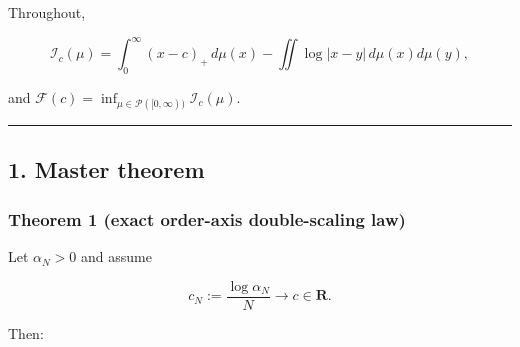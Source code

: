\documentclass[11pt]{article}
\theoremstyle{keio}
\theoremstyle{definition}
\theoremstyle{remark}
\begin{document}
Throughout,

\[
\mathcal I_c(\mu)
=\int_0^\infty (x-c)_+\,d\mu(x)
-\iint\log|x-y|\,d\mu(x)d\mu(y),
\]

and \(\mathcal F(c)=\inf_{\mu\in\mathcal P([0,\infty))}\mathcal I_c(\mu)\).

\begin{center}\rule{0.5\linewidth}{0.5pt}\end{center}

\subsection{1. Master theorem}

\subsubsection{Theorem 1 (exact order-axis double-scaling law)}

Let \(\alpha_N>0\) and assume

\[
c_N:=\frac{\log\alpha_N}{N}\longrightarrow c\in\mathbf R.
\]

Then:
\end{document}
